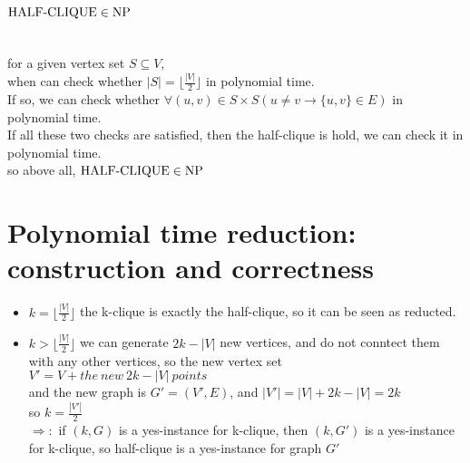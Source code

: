 \begin{parts}
	\part[2]{$\operatorname{HALF-CLIQUE}\in \mathbf{\operatorname{NP}}$}
	\begin{solution}
		\\for a given vertex set $S \subseteq V$,\\
		when can check whether $|S|=\lfloor\frac{|V|}{2}\rfloor$ in polynomial time.\\
		If so, we can check whether $\forall (u,v)\in S\times S (u\neq v\to \{u,v\}\in E)$ in polynomial time.\\
		If all these two checks are satisfied, then the half-clique is hold, we can check it in polynomial time.\\
		so above all, $\operatorname{HALF-CLIQUE}\in \mathbf{\operatorname{NP}}$\\
	\end{solution}
	\part[7]{Polynomial time reduction: construction and correctness}
	\begin{solution}
		\begin{itemize}
			\item $k=\lfloor\frac{|V|}{2}\rfloor$
			the k-clique is exactly the half-clique, so it can be seen as reducted.\\
			\item $k>\lfloor\frac{|V|}{2}\rfloor$
			we can generate $2k-|V|$ new vertices, and do not conntect them with any other vertices, so the new vertex set $V'=V+{the\ new\ 2k-|V|\ points}$\\
			and the new graph is $G'=(V',E)$, and $|V'|=|V|+2k-|V|=2k$\\
			so $k=\frac{|V'|}{2}$\\
			$\Rightarrow:$  if $(k,G)$ is a yes-instance for k-clique, then $(k,G')$ is a yes-instance for k-clique, so half-clique is a yes-instance for graph $G'$\\


\end{itemize}
\end{solution}
\end{parts}
